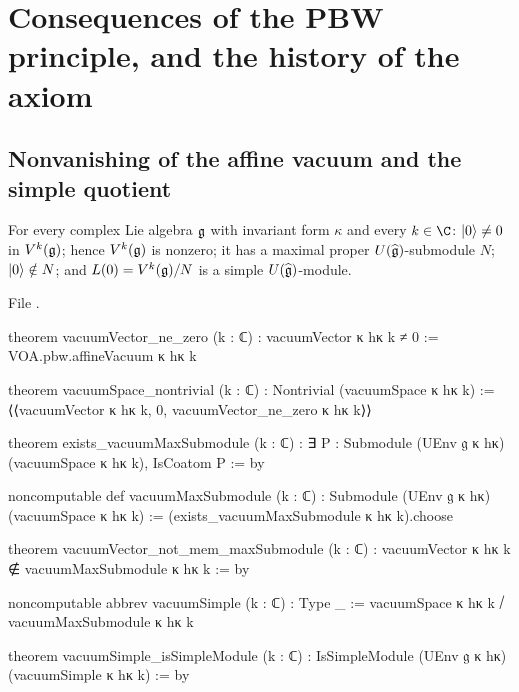 \section{Consequences of the PBW principle, and the history of the axiom}\label{l02:sec:consequences}

\subsection{Nonvanishing of the affine vacuum and the simple quotient}

\begin{theorem}\label{l02:thm:vacne}
For every complex Lie algebra $\mathfrak{g}$ with invariant form $\kappa$ and every $k\in\C$:
$|0\rangle\ne0$ in $V^k(\mathfrak{g})$; hence $V^k(\mathfrak{g})$ is nonzero; it has a maximal proper
$U(\widehat{\mathfrak{g}})$-submodule $N$; $|0\rangle\notin N$; and $L(0) = V^k(\mathfrak{g})/N$ is a simple
$U(\widehat{\mathfrak{g}})$-module.
\end{theorem}

File .
\begin{leancode}
theorem vacuumVector_ne_zero (k : ℂ) : vacuumVector κ hκ k ≠ 0 :=
  VOA.pbw.affineVacuum κ hκ k

theorem vacuumSpace_nontrivial (k : ℂ) : Nontrivial (vacuumSpace κ hκ k) :=
  ⟨⟨vacuumVector κ hκ k, 0, vacuumVector_ne_zero κ hκ k⟩⟩

theorem exists_vacuumMaxSubmodule (k : ℂ) :
    ∃ P : Submodule (UEnv 𝔤 κ hκ) (vacuumSpace κ hκ k), IsCoatom P := by

noncomputable def vacuumMaxSubmodule (k : ℂ) :
    Submodule (UEnv 𝔤 κ hκ) (vacuumSpace κ hκ k) :=
  (exists_vacuumMaxSubmodule κ hκ k).choose

theorem vacuumVector_not_mem_maxSubmodule (k : ℂ) :
    vacuumVector κ hκ k ∉ vacuumMaxSubmodule κ hκ k := by

noncomputable abbrev vacuumSimple (k : ℂ) : Type _ :=
  vacuumSpace κ hκ k ⧸ vacuumMaxSubmodule κ hκ k

theorem vacuumSimple_isSimpleModule (k : ℂ) :
    IsSimpleModule (UEnv 𝔤 κ hκ) (vacuumSimple κ hκ k) := by
\end{leancode}

